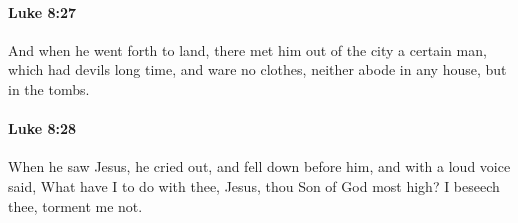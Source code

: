 		\paragraph{Luke 8:27} %
			\label{LUKE-8-27}

			And when he went forth to land, there met him out of the city a certain man, which had devils long time, and ware no clothes, neither abode in any house, but in the tombs.

			\begin{framed}
			\scriptsize
				\begin{compactdesc}
					\item[SBLG] 
				\end{compactdesc}
			\end{framed}

		\paragraph{Luke 8:28} %
			\label{LUKE-8-28}

			When he saw Jesus, he cried out, and fell down before him, and with a loud voice said, What have I to do with thee, Jesus, thou Son of God most high? I beseech thee, torment me not.

